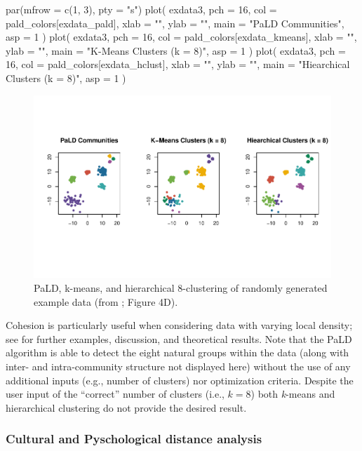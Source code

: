 \begin{Schunk}
\begin{Sinput}
par(mfrow = c(1, 3), pty = "s")
plot(
  exdata3,
  pch = 16,
  col = pald_colors[exdata_pald],
  xlab = "",
  ylab = "",
  main = "PaLD Communities",
  asp = 1
)
plot(
  exdata3,
  pch = 16,
  col = pald_colors[exdata_kmeans],
  xlab = "",
  ylab = "",
  main = "K-Means Clusters (k = 8)",
  asp = 1
)
plot(
  exdata3,
  pch = 16,
  col = pald_colors[exdata_hclust],
  xlab = "",
  ylab = "",
  main = "Hiearchical Clusters (k = 8)",
  asp = 1
)
\end{Sinput}
\begin{figure}
\includegraphics{dagostino-mcgowan_files/figure-latex/fig5-1} \caption[PaLD, k-means, and hierarchical 8-clustering of randomly generated example data (from \citet{berenhaut2022social}]{PaLD, k-means, and hierarchical 8-clustering of randomly generated example data (from \citet{berenhaut2022social}; Figure 4D).}\label{fig:fig5}
\end{figure}
\end{Schunk}

Cohesion is particularly useful when considering data with varying local
density; see \citet{berenhaut2022social} for further examples,
discussion, and theoretical results. Note that the PaLD algorithm is
able to detect the eight natural groups within the data (along with
inter- and intra-community structure not displayed here) without the use
of any additional inputs (e.g., number of clusters) nor optimization
criteria. Despite the user input of the ``correct'' number of clusters
(i.e., \(k = 8\)) both \emph{k}-means and hierarchical clustering do not
provide the desired result.

\hypertarget{cultural-and-pyschological-distance-analysis}{%
\subsubsection{Cultural and Pyschological distance
analysis}\label{cultural-and-pyschological-distance-analysis}}

